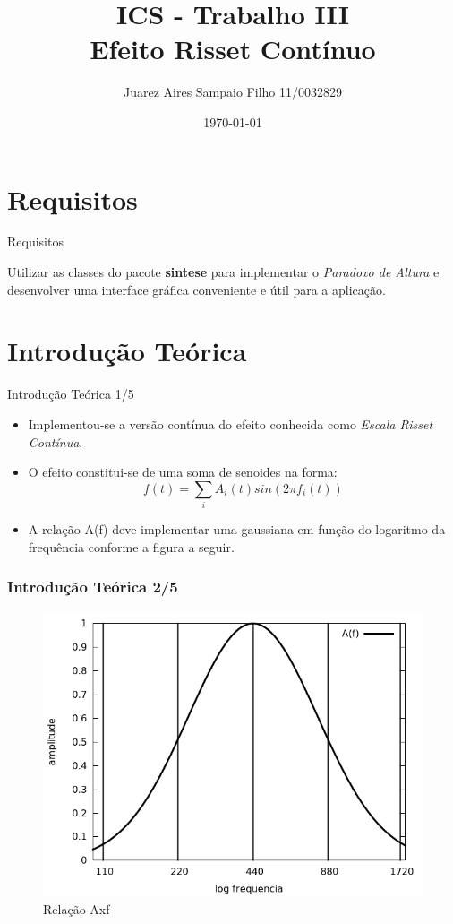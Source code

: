 \documentclass{beamer}
\title[Introdução a Computação Sônica]{ ICS - Trabalho III \\ Efeito Risset Contínuo}
\author{Juarez Aires Sampaio Filho 11/0032829}
\institute{Universidade de Brasília}
\date{\today}
\begin{document}
\begin{frame}
        \titlepage
\end{frame}

\section{Requisitos}
\begin{frame}{Requisitos}
	\begin{block}{}
	Utilizar as classes do pacote \textbf{sintese} para implementar o \emph{Paradoxo de Altura} e desenvolver uma interface gráfica conveniente e útil para a aplicação.
	\end{block}
\end{frame}

\section{Introdução Teórica}
\begin{frame}{Introdução Teórica 1/5}
\begin{itemize}
\item Implementou-se a versão contínua do efeito conhecida como \emph{Escala Risset Contínua}.
\item O efeito constitui-se de uma soma de senoides na forma:
\begin{equation}
	f(t) = \sum_{i} A_i(t) sin(2 \pi f_i(t))
\end{equation}
\item A relação A(f) deve implementar uma gaussiana em função do logaritmo da frequência
conforme a figura a seguir.
\end{itemize}
\end{frame}

\begin{frame}
 \frametitle{Introdução Teórica 2/5}
 \begin{figure}
  \includegraphics[scale=0.3]{./images/AxF.png}
  \caption{Relação Axf}
   \end{figure}
\end{frame}
\end{document}
